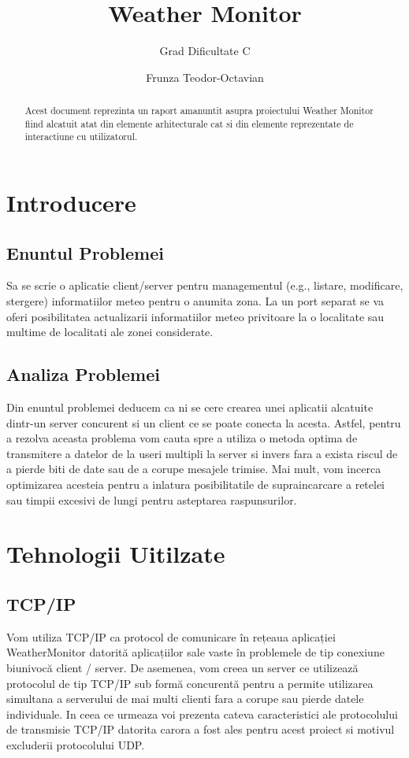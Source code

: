 \documentclass{llncs}
\begin{document}
%
\title{Weather Monitor}
%
\subtitle{Grad Dificultate C}
%
\author{Frunza Teodor-Octavian}
%
%
\maketitle
%
\begin{abstract}
Acest document reprezinta un raport amanuntit asupra proiectului Weather Monitor fiind alcatuit atat din elemente arhitecturale cat si din elemente reprezentate de interactiune cu utilizatorul.
\end{abstract}
%
\section{Introducere}
%
\subsection{Enuntul Problemei}
Sa se scrie o aplicatie client/server pentru managementul (e.g., listare, modificare, stergere) informatiilor meteo pentru o anumita zona. La un port separat se va oferi posibilitatea actualizarii informatiilor meteo privitoare la o localitate sau multime de localitati ale zonei considerate.
%
\subsection{Analiza Problemei}
Din enuntul problemei deducem ca ni se cere crearea unei aplicatii alcatuite dintr-un server concurent si un client ce se poate conecta la acesta.
Astfel, pentru a rezolva aceasta problema vom cauta spre a utiliza o metoda optima de transmitere a datelor de la useri multipli la server si invers fara a exista riscul de a pierde biti de date sau
de a corupe mesajele trimise. Mai mult, vom incerca optimizarea acesteia pentru a inlatura posibilitatile de supraincarcare a retelei sau timpii excesivi de lungi pentru asteptarea raspunsurilor.
%
\section{Tehnologii Uitilzate}
%
\subsection{TCP/IP}
Vom utiliza TCP/IP ca protocol de comunicare în rețeaua aplicației WeatherMonitor datorită aplicațiilor sale vaste în problemele de tip conexiune biunivocă client / server. De asemenea, vom creea un server ce utilizează protocolul de tip TCP/IP sub formă concurentă pentru a permite utilizarea simultana a serverului de mai multi clienti fara a corupe sau pierde datele individuale. In ceea ce urmeaza voi prezenta cateva caracteristici ale protocolului de transmisie TCP/IP datorita carora a fost ales pentru acest proiect si motivul excluderii protocolului UDP.
%
\end{document}
